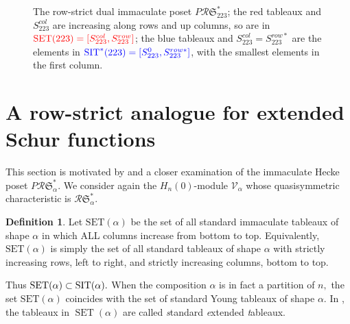 \documentclass[12pt,letterpaper]{amsart}
\theoremstyle{definition}
\newtheorem{definition}[theorem]{Definition}
\newcommand{\rdI}{\mathcal{R}\mathfrak{S}^*}
\newcommand{\SET}{\ensuremath{\operatorname{SET}}} \newcommand{\NSET}{\ensuremath{\operatorname{NSET}}}\newcommand{\SRCT}{\ensuremath{\operatorname{SRCT}}}
\newcommand{\hn}{H_n(0)}
\begin{document}
\begin{figure}[htb]
{	
}			
\caption{\small{The row-strict dual immaculate poset $P\rdI_{223}$; the red tableaux and $S^{col}_{223}$ are increasing along rows and up columns, so are in $\textcolor{red}{\SET(223)=[S^{col}_{223}, S^{row}_{223}]}$; the blue tableaux and $S^{col}_{223}=S^{row*}_{223}$ are the elements in $\textcolor{blue}{\operatorname{SIT}^*(223)=[S^0_{223}, S^{row*}_{223}]}$, with the smallest elements in the first column.}}\label{fig:Poset}	
\end{figure}


\section{A row-strict analogue for extended Schur functions}\label{sec:row-strict-ext}

This section is motivated by \cite{S2020} and a closer examination of the immaculate Hecke poset $P\rdI_\alpha.$ 
We consider again the $\hn$-module $\mathcal{V}_{\alpha}$ whose quasisymmetric characteristic is $\rdI_\alpha$.

\begin{definition}\label{def:SET} Let $\mathrm{SET}(\alpha)$ be the set of all standard immaculate tableaux of shape $\alpha$ in which ALL columns increase from bottom to top. Equivalently, $\mathrm{SET}(\alpha)$ is simply the set of all standard tableaux of shape $\alpha$ with strictly increasing rows, left to right, and strictly increasing columns, bottom to top. 
\end{definition}

Thus $\mathrm{SET}(\alpha)\subset \operatorname{SIT}(\alpha).$ When the composition $\alpha$ is in fact a partition of $n,$ the set $\mathrm{SET}(\alpha)$ coincides with the set of standard Young tableaux of shape $\alpha.$  In \cite{S2020}, the tableaux in $\SET(\alpha)$ are called 
\textit{s}tandard \textit{e}xtended \textit{t}ableaux.   
\end{document}
